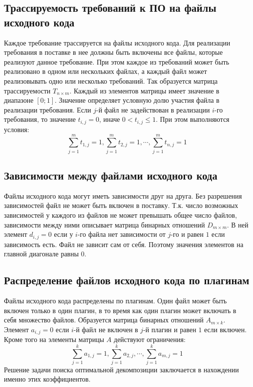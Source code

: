 \subsection*{Трассируемость требований к ПО на файлы исходного кода}
Каждое требование трассируется на файлы исходного кода. Для реализации требования в поставке в нее должны быть включены все файлы, которые реализуют данное требование. При этом каждое из требований может быть реализовано в одном или нескольких файлах, а каждый файл может реализовывать одно или несколько требований. Так образуется матрица трассируемости $T_{n \times m}$. Каждый из элементов матрицы имеет значение в диапазоне $[0;1]$. Значение определяет условную долю участия файла в реализации требования. Если $j$-й файл не задействован в реализации $i$-го требования, то значение $t_{i, j} = 0$, иначе $0 < t_{i, j} \le 1$. При этом выполняются условия:
\begin{equation}
  \displaystyle \sum^{m}_{j = 1}t_{1, j} = 1, 
    \sum^{m}_{j = 1}t_{2, j} = 1, \cdots, \sum^{m}_{j = 1}t_{n, j} = 1
\end{equation}

\subsection*{Зависимости между файлами исходного кода}
Файлы исходного кода могут иметь зависимости друг на друга. Без разрешения зависимостей файл не может быть включен в поставку. Т.к. число возможных зависимостей у каждого из файлов не может превышать общее число файлов, зависимости между ними описывает матрица бинарных отношений $D_{m \times m}$. В ней элемент $d_{i, j} = 0$ если у $i$-го файла нет зависимости от $j$-го и равен $1$ если зависимость есть. Файл не зависит сам от себя. Поэтому значения элементов на главной диагонале равны $0$.

\subsection*{Распределение файлов исходного кода по плагинам}
Файлы исходного кода распределены по плагинам. Один файл может быть включен только в один плагин, в то время как один плагин может включать в себя множество файлов. Образуется матрица бинарных отношений $A_{m \times k}$. Элемент $a_{i, j} = 0$ если $i$-й файл не включен в $j$-й плагин и равен $1$ если включен. Кроме того на элементы матрицы $A$ действуют ограничения:
\begin{equation}
  \displaystyle \sum^{k}_{j = 1}a_{1, j} = 1, \sum^{k}_{j = 1}a_{2, j}, \cdots, \sum^{k}_{j = 1}a_{m, j} = 1
\end{equation}
Решение задачи поиска оптимальной декомпозиции заключается в нахождении именно этих коэффициентов.

